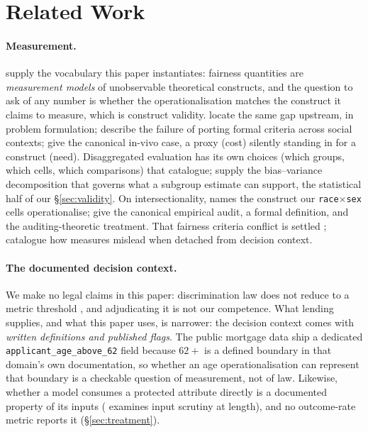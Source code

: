 \documentclass[sigconf,nonacm]{acmart}
\begin{document}
\section{Related Work}
\label{sec:background}

\paragraph{Measurement.} \citet{jacobswallach2021} supply the vocabulary this
paper instantiates: fairness quantities are \emph{measurement models} of
unobservable theoretical constructs, and the question to ask of any number is
whether the operationalisation matches the construct it claims to measure,
which is construct validity. \citet{passi2019} locate the same gap upstream,
in problem
formulation; \citet{selbst2019} describe the failure of porting formal
criteria across social contexts; \citet{obermeyer2019} give the canonical
in-vivo case, a proxy (cost) silently standing in for a construct (need).
Disaggregated evaluation has its own choices (which groups, which cells,
which comparisons) that \citet{barocas2021} catalogue; \citet{chen2018}
supply the bias--variance decomposition that governs what a subgroup estimate
can support, the statistical half of our \S\ref{sec:validity}. On
intersectionality, \citet{crenshaw1989} names the construct our
\texttt{race}$\times$\texttt{sex} cells operationalise; \citet{buolamwini2018}
give the canonical empirical audit, \citet{foulds2020} a formal definition,
and \citet{kearns2018} the auditing-theoretic treatment. That fairness
criteria conflict is settled \citep{chouldechova2017,kleinberg2017,hardt2016};
\citet{corbettdavies2018} catalogue how measures mislead when detached from
decision context.

\paragraph{The documented decision context.} We make no legal claims in this
paper: discrimination law does not reduce to a metric threshold
\citep{barocas2016,wachter2021}, and adjudicating it is not our competence.
What lending supplies, and what this paper uses, is narrower: the decision
context comes with \emph{written definitions and published flags}. The public
mortgage data ship a dedicated \texttt{applicant\_age\_above\_62} field
because $62{+}$ is a defined boundary in that domain's own documentation, so
whether an age operationalisation can represent that boundary is a checkable
question of measurement, not of law. Likewise, whether a model consumes a
protected attribute directly is a documented property of its inputs
(\citet{gillis2022} examines input scrutiny at length), and no outcome-rate
metric reports it (\S\ref{sec:treatment}).
\end{document}
